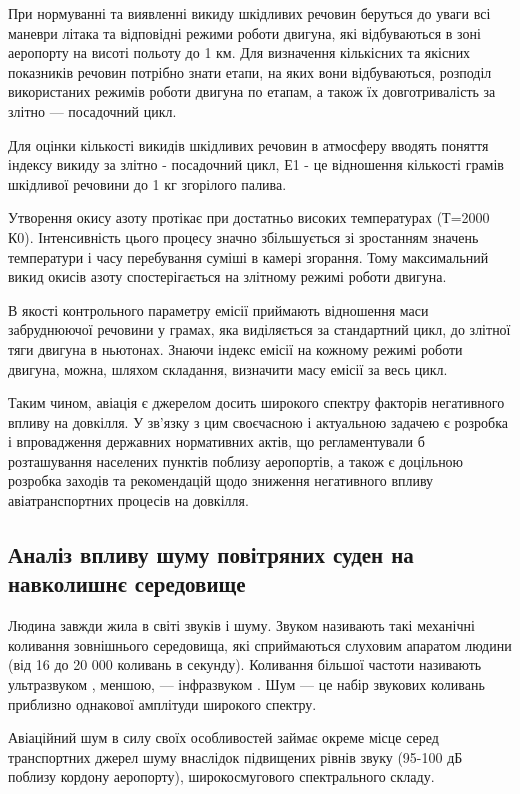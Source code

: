 При нормуванні та виявленні викиду шкідливих речовин беруться до уваги всі маневри літака та 
відповідні режими роботи двигуна, які відбуваються в зоні аеропорту на висоті польоту до 1 км. 
Для визначення кількісних та якісних показників речовин потрібно знати етапи, на яких вони 
відбуваються, розподіл використаних режимів роботи двигуна по етапам, а також їх довготривалість 
за злітно — посадочний цикл.

Для оцінки кількості викидів шкідливих речовин в атмосферу вводять поняття індексу викиду за злітно - 
посадочний цикл, Е1 - це відношення кількості грамів шкідливої речовини до 1 кг згорілого палива.

Утворення окису азоту протікає при достатньо високих температурах (Т=2000 К0). Інтенсивність цього 
процесу значно збільшується зі зростанням значень температури і часу перебування суміші в камері згорання. 
Тому максимальний викид окисів азоту спостерігається на злітному режимі роботи двигуна.

В якості контрольного параметру емісії приймають відношення маси забруднюючої речовини у грамах, 
яка виділяється за стандартний цикл, до злітної тяги двигуна в ньютонах. Знаючи індекс емісії на 
кожному режимі роботи двигуна, можна, шляхом складання, визначити масу емісії за весь цикл.


Таким чином, авіація є джерелом досить широкого спектру факторів негативного впливу на довкілля. 
У зв’язку з цим своєчасною і актуальною задачею є розробка і впровадження державних нормативних 
актів, що регламентували б розташування населених пунктів поблизу аеропортів, а також є доцільною 
розробка заходів та рекомендацій щодо зниження негативного впливу авіатранспортних процесів на довкілля.

\subsection{Аналіз впливу шуму повітряних суден на навколишнє середовище}

Людина завжди жила в світі звуків і шуму. Звуком називають такі механічні коливання зовнішнього 
середовища, які сприймаються слуховим апаратом людини (від 16 до 20 000 коливань в секунду). 
Коливання більшої частоти називають ультразвуком , меншою, --- інфразвуком . Шум --- це набір 
звукових коливань приблизно однакової амплітуди широкого спектру. 

Авіаційний шум в силу своїх особливостей займає окреме місце серед транспортних джерел шуму внаслідок 
підвищених рівнів звуку (95-100 дБ поблизу кордону аеропорту), широкосмугового спектрального складу. 

